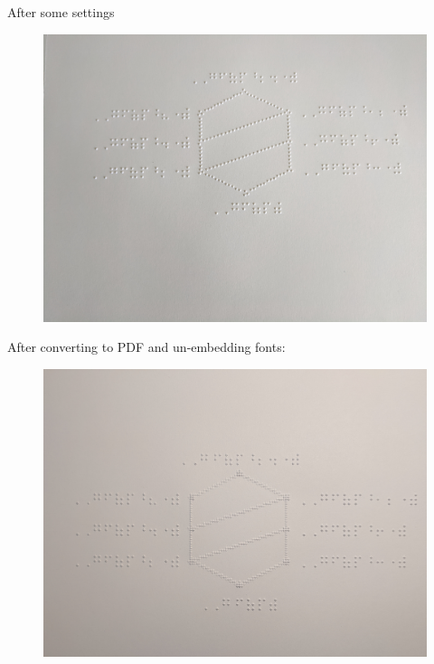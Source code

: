 \begin{frame}
After some settings

\begin{figure}
\centering
\includegraphics{diagram_better.jpg}
\end{figure}

\end{frame}



\begin{frame}
After converting to PDF and un-embedding fonts:

\begin{figure}
\centering
\includegraphics{diagram_best.jpg}
\end{figure}

\end{frame}


